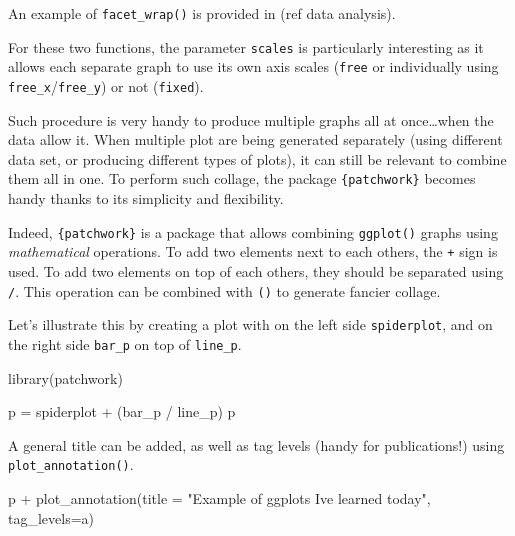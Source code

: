 \documentclass[
]{book}
\newenvironment{Shaded}{\begin{snugshade}}{\end{snugshade}}
\newcommand{\AttributeTok}[1]{\textcolor[rgb]{0.77,0.63,0.00}{#1}}
\newcommand{\FunctionTok}[1]{\textcolor[rgb]{0.00,0.00,0.00}{#1}}
\newcommand{\NormalTok}[1]{#1}
\newcommand{\OtherTok}[1]{\textcolor[rgb]{0.56,0.35,0.01}{#1}}
\newcommand{\SpecialCharTok}[1]{\textcolor[rgb]{0.00,0.00,0.00}{#1}}
\newcommand{\StringTok}[1]{\textcolor[rgb]{0.31,0.60,0.02}{#1}}
\begin{document}
An example of \texttt{facet\_wrap()} is provided in (ref data analysis).

For these two functions, the parameter \texttt{scales} is particularly interesting as it allows each separate graph to use its own axis scales (\texttt{free} or individually using \texttt{free\_x}/\texttt{free\_y}) or not (\texttt{fixed}).

Such procedure is very handy to produce multiple graphs all at once\ldots when the data allow it.
When multiple plot are being generated separately (using different data set, or producing different types of plots), it can still be relevant to combine them all in one. To perform such collage, the package \texttt{\{patchwork\}} becomes handy thanks to its simplicity and flexibility.

Indeed, \texttt{\{patchwork\}} is a package that allows combining \texttt{ggplot()} graphs using \emph{mathematical} operations.
To add two elements next to each others, the \texttt{+} sign is used. To add two elements on top of each others, they should be separated using \texttt{/}. This operation can be combined with \texttt{()} to generate fancier collage.

Let's illustrate this by creating a plot with on the left side \texttt{spiderplot}, and on the right side \texttt{bar\_p} on top of \texttt{line\_p}.

\begin{Shaded}
\begin{Highlighting}[]
\FunctionTok{library}\NormalTok{(patchwork)}

\NormalTok{p }\OtherTok{=}\NormalTok{ spiderplot }\SpecialCharTok{+}\NormalTok{ (bar\_p }\SpecialCharTok{/}\NormalTok{ line\_p)}
\NormalTok{p}
\end{Highlighting}
\end{Shaded}

A general title can be added, as well as tag levels (handy for publications!) using \texttt{plot\_annotation()}.

\begin{Shaded}
\begin{Highlighting}[]
\NormalTok{p }\SpecialCharTok{+} \FunctionTok{plot\_annotation}\NormalTok{(}\AttributeTok{title =} \StringTok{"Example of \textquotesingle{}ggplots\textquotesingle{} I\textquotesingle{}ve learned today"}\NormalTok{, }\AttributeTok{tag\_levels=}\StringTok{\textquotesingle{}a\textquotesingle{}}\NormalTok{)}
\end{Highlighting}
\end{Shaded}
\end{document}
